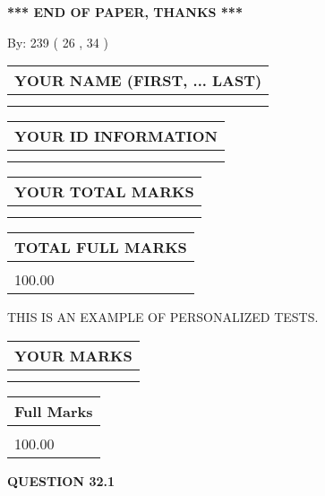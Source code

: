 \documentclass[12pt]{article}
\begin{document}
 

 
\vspace{0.3in}
   
   
 \vspace{0.2in}
 
   
   
   
   
\vspace{1.0in} 
{\textbf{\large{ *** END OF PAPER, THANKS *** }}} 
   
   
\hspace{1.0in} By: 
 239 ( 26 ,  34 )
   
   
   
   
\newpage 
\setcounter{page}{ 
    32001 } 
   
   
   
   
\noindent\begin{tabular}{|l|}
\hline
YOUR NAME (FIRST, ... LAST)  \\
\hline
 \\ 
 \\ 
\hline
\end{tabular}
\hspace{0.05in} \begin{tabular}{|l|}
\hline
 YOUR   ID   INFORMATION  \\
\hline
 \\ 
 \\ 
\hline
\end{tabular}
   
   
\vspace{0.2in}\noindent\begin{tabular}{|l|}
\hline
YOUR TOTAL MARKS  \\
\hline
 \\ 
 \\ 
\hline
\end{tabular}
\hspace{0.05in} \begin{tabular}{|l|}
\hline
TOTAL FULL MARKS  \\
\hline
 \\ 
100.00 \\
\hline
\end{tabular}
   
   
 \vspace{0.2in}
{\Huge  THIS IS AN EXAMPLE OF}
{\Huge  PERSONALIZED TESTS. }
   
   
  
\vspace{0.2in}
  
\noindent\begin{tabular}{|l|}
\hline
 YOUR MARKS  \\
\hline
 \\ 
 \\ 
\hline
\end{tabular}
\hspace{0.05in} \begin{tabular}{|l|}
\hline
 Full Marks  \\
\hline
 \\ 
100.00 \\
\hline
\end{tabular}
{\textbf{\Large{QUESTION
32.1 
}}}
  
\end{document}
